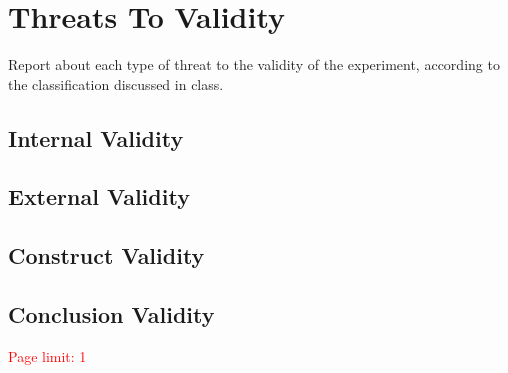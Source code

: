 \section{Threats To Validity}\label{sec:threats}
Report about each type of threat to the validity of the experiment, according to the classification discussed in class.

\subsection{Internal Validity}
\subsection{External Validity}
\subsection{Construct Validity}
\subsection{Conclusion Validity}

\textcolor{red}{Page limit: 1}

